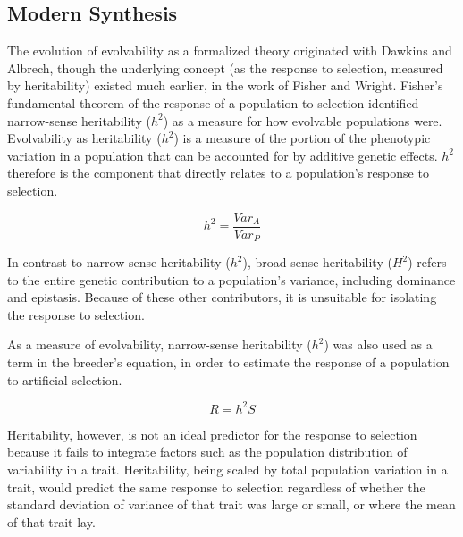 \documentclass[PhD]{msu-thesis}
\begin{document}
\subsection{Modern Synthesis}
The evolution of evolvability as a formalized theory originated with Dawkins\cite{dawkins_13_2003} and \\Albrech\cite{alberch_genes_1991}, though the underlying concept (as the response to selection, measured by heritability) existed much earlier, in the work of Fisher\cite{fisher_genetical_1930} and Wright\cite{wright_evolution_1931}. Fisher’s fundamental theorem of the response of a population to selection identified narrow-sense heritability ($h^2$) as a measure for how evolvable populations were. Evolvability as heritability ($h^2$) is a measure of the portion of the phenotypic variation in a population that can be accounted for by additive genetic effects. $h^2$ therefore is the component that directly relates to a population’s response to selection\cite{houle_comparing_1992}.

\begin{equation}
h^2 = \frac{Var_A}{Var_P}
\end{equation}

In contrast to narrow-sense heritability ($h^2$), broad-sense heritability ($H^2$) refers to the entire genetic contribution to a population’s variance, including dominance and epistasis. Because of these other contributors, it is unsuitable for isolating the response to selection. 

As a measure of evolvability, narrow-sense heritability ($h^2$) was also used as a term in the breeder’s equation, in order to estimate the response of a population to artificial selection.

\begin{equation}
R = {h^2}S
\end{equation}

Heritability, however, is not an ideal predictor for the response to selection because it fails to integrate factors such as the population distribution of variability in a trait\cite{houle_comparing_1992}. Heritability, being scaled by total population variation in a trait, would predict the same response to selection regardless of whether the standard deviation of variance of that trait was large or small, or where the mean of that trait lay.
\end{document}
